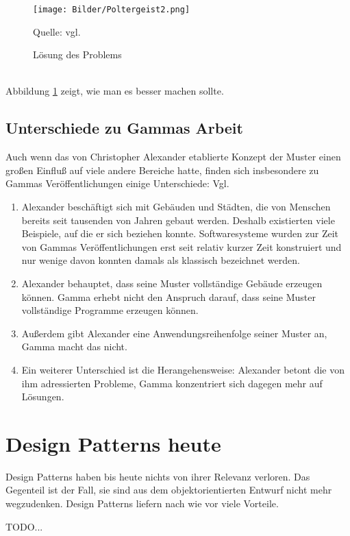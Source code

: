 \documentclass[fontsize=11pt,a4paper,final]{scrreprt}[2003/01/01]
\newcommand*{\quelle}{%
	\footnotesize Quelle: 
}
\begin{document}
\begin{figure}[H]
	\centering
	\texttt{[image: Bilder/Poltergeist2.png]}
	\caption{Lösung des Problems}
	\quelle{vgl. \cite[S. 61]{Brown1998}}
	\label{fig:Poltergeist2}
\end{figure} \ \\
Abbildung \ref{fig:Poltergeist2} zeigt, wie man es besser machen sollte.

\section{Unterschiede zu Gammas Arbeit}
Auch wenn das von Christopher Alexander etablierte Konzept der Muster einen großen Einfluß auf viele andere Bereiche hatte, finden sich insbesondere zu Gammas Veröffentlichungen einige Unterschiede: Vgl. \cite[S. 438 - 439]{gamma2004}

\begin{enumerate} 
\item Alexander beschäftigt sich mit Gebäuden und Städten, die von Menschen bereits seit tausenden von Jahren gebaut werden. Deshalb existierten viele Beispiele, auf die er sich beziehen konnte. Softwaresysteme wurden zur Zeit von Gammas Veröffentlichungen erst seit relativ kurzer Zeit konstruiert und nur wenige davon konnten damals als klassisch bezeichnet werden.
\item Alexander behauptet, dass seine Muster vollständige Gebäude erzeugen können. Gamma erhebt nicht den Anspruch darauf, dass seine Muster vollständige Programme erzeugen können.
\item Außerdem gibt Alexander eine Anwendungsreihenfolge seiner Muster an, Gamma macht das nicht.
\item Ein weiterer Unterschied ist die Herangehensweise: Alexander betont die von ihm adressierten Probleme, Gamma konzentriert sich dagegen mehr auf Lösungen.
\end{enumerate}

\chapter{Design Patterns heute}\label{se:Design Patterns heute}

Design Patterns haben bis heute nichts von ihrer Relevanz verloren. Das Gegenteil ist der Fall, sie sind aus dem objektorientierten Entwurf nicht mehr wegzudenken. Design Patterns liefern nach wie vor viele Vorteile.

TODO...
   
\newpage

\end{document}
